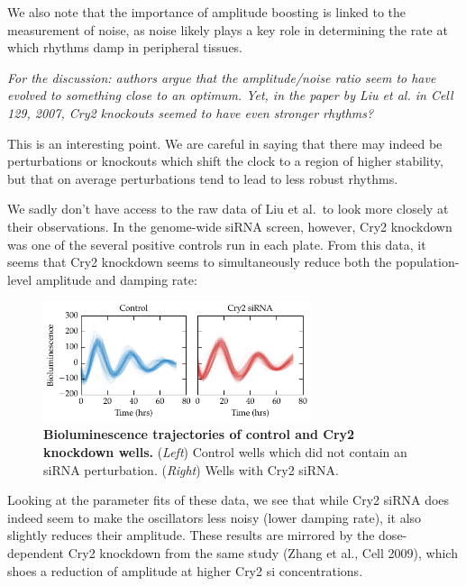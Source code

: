 \documentclass[11pt, letterpaper]{article}
\newenvironment{reviewer}{\itshape\color{gray}}{}
\begin{document}
We also note that the importance of amplitude boosting is linked to the measurement of noise, as noise likely plays a key role in determining the rate at which rhythms damp in peripheral tissues.

\begin{reviewer}
For the discussion: authors argue that the amplitude/noise ratio seem to have evolved to something close to an optimum. Yet, in the paper by Liu et al. in Cell 129, 2007, Cry2 knockouts seemed to have even stronger rhythms?
\end{reviewer}

This is an interesting point. We are careful in saying that there may indeed be perturbations or knockouts which shift the clock to a region of higher stability, but that on average perturbations tend to lead to less robust rhythms.

We sadly don't have access to the raw data of Liu et al.\ to look more closely at their observations. In the genome-wide siRNA screen, however, Cry2 knockdown was one of the several positive controls run in each plate.
From this data, it seems that Cry2 knockdown seems to simultaneously reduce both the population-level amplitude and damping rate:

\begin{figure}[h!]
  \begin{center}
    \includegraphics[width=0.7\textwidth]{response_figs/cry2_ts.pdf}
  \end{center}
  \caption{{\bfseries Bioluminescence trajectories of control and Cry2 knockdown wells.} ({\itshape Left}) Control wells which did not contain an siRNA perturbation. ({\itshape Right}) Wells with Cry2 siRNA.}
\end{figure}

Looking at the parameter fits of these data, we see that while Cry2 siRNA does indeed seem to make the oscillators less noisy (lower damping rate), it also slightly reduces their amplitude. These results are mirrored by the dose-dependent Cry2 knockdown from the same study (Zhang et al., Cell 2009), which shoes a reduction of amplitude at higher Cry2 si concentrations.
\end{document}
